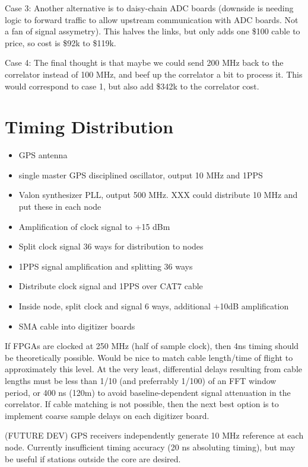 \documentclass[11pt]{article}
\begin{document}
Case 3: Another alternative is to daisy-chain ADC boards (downside is needing
logic to forward traffic to allow upstream communication with ADC boards.  Not a fan
of signal assymetry).
This halves the links, but only adds one \$100 cable to price, so cost is \$92k
to \$119k.

Case 4: The final thought is that maybe we could send 200 MHz back to the
correlator instead of 100 MHz, and beef up the correlator a bit to process it.
This would correspond to case 1, but also add \$342k to the correlator cost.

\section{Timing Distribution}

\begin{itemize}
\item GPS antenna
\item single master GPS disciplined oscillator, output 10 MHz and 1PPS
\item Valon synthesizer PLL, output 500 MHz. XXX could distribute 10 MHz and put these in each node
\item Amplification of clock signal to +15 dBm
\item Split clock signal 36 ways for distribution to nodes
\item 1PPS signal amplification and splitting 36 ways
\item Distribute clock signal and 1PPS over CAT7 cable
\item Inside node, split clock and signal 6 ways, additional +10dB amplification
\item SMA cable into digitizer boards
\end{itemize}

If FPGAs are clocked at 250 MHz (half of sample clock), then 4ns timing should be theoretically possible.
Would be nice to match cable length/time of flight to approximately this level.  At the very least,
differential delays resulting from cable lengths must be less than 1/10 (and preferrably 1/100)
of an FFT window period,
or 400 ns (120m) to avoid baseline-dependent signal attenuation in the correlator.  If cable matching
is not possible, then the next best option is to implement coarse sample delays on each digitizer board.

(FUTURE DEV) GPS receivers independently generate 10 MHz reference at each node.  Currently
insufficient timing accuracy (20 ns absoluting timing), but may be useful if stations outside the core are desired.
\end{document}
